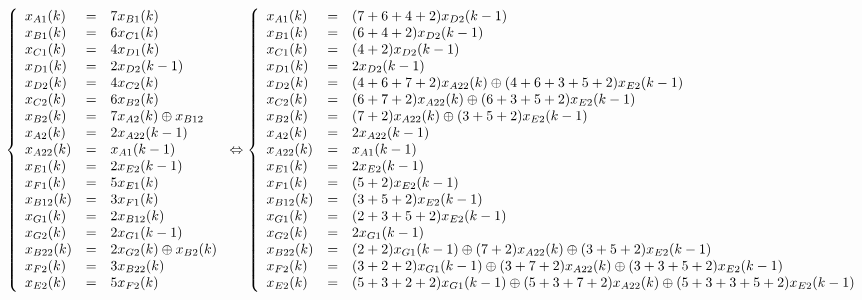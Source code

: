 \begin{equation}
\left\lbrace
\begin{array}{l c l}
x_{A1}(k) &=&	7x_{B1}(k)\\ 
x_{B1}(k) &=&	6x_{C1}(k)\\
x_{C1}(k) &=& 	4x_{D1}(k)\\
x_{D1}(k) &=&	2x_{D2}(k-1)\\
x_{D2}(k) &=&	4x_{C2}(k)\\
x_{C2}(k) &=&	6x_{B2}(k)\\
x_{B2}(k) &=&	7x_{A2}(k) \oplus x_{B12}\\
x_{A2}(k) &=&	2x_{A22}(k-1)\\
x_{A22}(k) &=&	x_{A1}(k-1)\\
x_{E1}(k) &=&	2x_{E2}(k-1)\\
x_{F1}(k) &=&	5x_{E1}(k)\\
x_{B12}(k) &=&	3x_{F1}(k)\\
x_{G1}(k) &=&	2x_{B12}(k)\\
x_{G2}(k) &=&	2x_{G1}(k-1)\\
x_{B22}(k) &=&	2x_{G2}(k) \oplus x_{B2}(k)\\
x_{F2}(k) &=&	3x_{B22}(k)\\
x_{E2}(k) &=&	5x_{F2}(k)   \\  
\end{array}
\right. 
\Leftrightarrow
\left\lbrace
\begin{array}{l c l}
x_{A1}(k) &=&	(7+6+4+2)x_{D2}(k-1)\\ 
x_{B1}(k) &=&	(6+4+2)x_{D2}(k-1)\\
x_{C1}(k) &=& 	(4+2)x_{D2}(k-1)\\
x_{D1}(k) &=&	2x_{D2}(k-1)\\
x_{D2}(k) &=&	(4+6+7+2)x_{A22}(k) \oplus  (4+6+3+5+2)x_{E2}(k-1)\\
x_{C2}(k) &=&	(6+7+2)x_{A22}(k) \oplus  (6+3+5+2)x_{E2}(k-1)\\
x_{B2}(k) &=&	(7+2)x_{A22}(k) \oplus  (3+5+2)x_{E2}(k-1)\\
x_{A2}(k) &=&	2x_{A22}(k-1)\\
x_{A22}(k) &=&	x_{A1}(k-1)\\
x_{E1}(k) &=&	2x_{E2}(k-1)\\
x_{F1}(k) &=&	(5+2)x_{E2}(k-1)\\
x_{B12}(k) &=&	(3+5+2)x_{E2}(k-1)\\
x_{G1}(k) &=&	(2+3+5+2)x_{E2}(k-1)\\
x_{G2}(k) &=&	2x_{G1}(k-1)\\
x_{B22}(k) &=&	(2+2)x_{G1}(k-1) \oplus (7+2)x_{A22}(k) \oplus  (3+5+2)x_{E2}(k-1)\\
x_{F2}(k) &=&	(3+2+2)x_{G1}(k-1) \oplus (3+7+2)x_{A22}(k) \oplus  (3+3+5+2)x_{E2}(k-1)\\
x_{E2}(k) &=&	(5+3+2+2)x_{G1}(k-1) \oplus (5+3+7+2)x_{A22}(k) \oplus  (5+3+3+5+2)x_{E2}(k-1)   \\  
\end{array}
\right. 
\end{equation}
